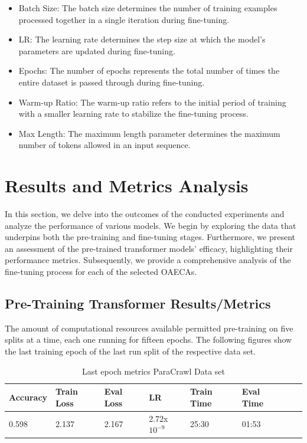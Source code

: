 \begin{itemize}
   \item Batch Size: The batch size determines the number of training examples processed together in a single iteration during fine-tuning.
   \item LR: The learning rate determines the step size at which the model's parameters are updated during fine-tuning.
   \item Epochs: The number of epochs represents the total number of times the entire dataset is passed through during fine-tuning.
   \item Warm-up Ratio: The warm-up ratio refers to the initial period of training with a smaller learning rate to stabilize the fine-tuning process.
   \item Max Length: The maximum length parameter determines the maximum number of tokens allowed in an input sequence.
 \end{itemize}




\section{Results and Metrics Analysis}
In this section, we delve into the outcomes of the conducted experiments and analyze the performance of various models. We begin by exploring the data that underpins both the pre-training and fine-tuning stages. Furthermore, we present an assessment of the pre-trained transformer models' efficacy, highlighting their performance metrics. Subsequently, we provide a comprehensive analysis of the fine-tuning process for each of the selected OAECAs.
\subsection{Pre-Training Transformer Results/Metrics}

The amount of computational resources available permitted pre-training on five splits at a time, each one running for fifteen epochs. The following figures show the last training epoch of the last run split of the respective data set.


\begin{table}[H]
\label{table:LastepochParaCrawlDataset}
\centering
\begin{tabular}{|l|l|l|l|l|l|l|l}
\hline
Accuracy & Train Loss & Eval Loss & LR & Train Time & Eval Time \\ \hline
0.598 & 2.137 & 2.167 &   2.72x$10^{-9}$ &  25:30  & 01:53   \\ \hline
\end{tabular}
\caption{Last epoch metrics ParaCrawl Data set}
\end{table}

